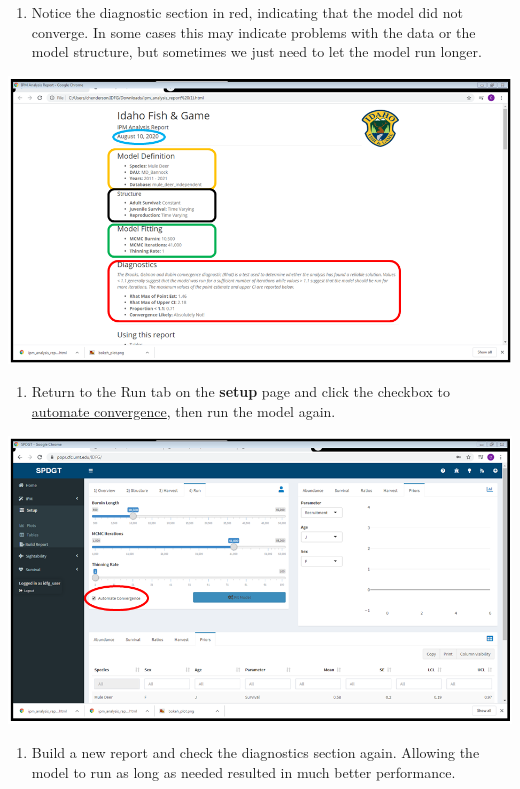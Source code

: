 \documentclass[
]{book}
\providecommand{\tightlist}{%
  \setlength{\itemsep}{0pt}\setlength{\parskip}{0pt}}
\begin{document}
\begin{enumerate}
\def\labelenumi{\arabic{enumi}.}
\setcounter{enumi}{12}
\tightlist
\item
  Notice the diagnostic section in red, indicating that the model did not converge. In some cases this may indicate problems with the data or the model structure, but sometimes we just need to let the model run longer.
\end{enumerate}

\includegraphics{./www/ipm_14.PNG}

\begin{enumerate}
\def\labelenumi{\arabic{enumi}.}
\setcounter{enumi}{13}
\tightlist
\item
  Return to the Run tab on the \textbf{setup} page and click the checkbox to \protect\hyperlink{gl-converge}{automate convergence}, then run the model again.
\end{enumerate}

\includegraphics{./www/ipm_15.PNG}

\begin{enumerate}
\def\labelenumi{\arabic{enumi}.}
\setcounter{enumi}{14}
\tightlist
\item
  Build a new report and check the diagnostics section again. Allowing the model to run as long as needed resulted in much better performance.
\end{enumerate}
\end{document}
